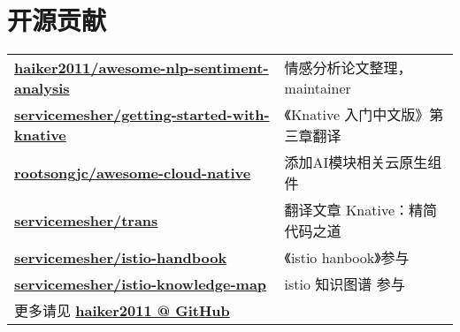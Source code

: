 \documentclass[]{deedy-resume-openfont}
\begin{document}
\begin{minipage}[t]{0.68\textwidth}
\section{开源贡献}
\begin{tabular}{ll}
\href{https://github.com/haiker2011/awesome-nlp-sentiment-analysis/commits?author=haiker2011}{\bf haiker2011/awesome-nlp-sentiment-analysis} & 情感分析论文整理，maintainer \\
\href{https://github.com/servicemesher/getting-started-with-knative/commits?author=haiker2011}{\bf servicemesher/getting-started-with-knative} & 《Knative 入门中文版》第三章翻译 \\
\href{https://github.com/rootsongjc/awesome-cloud-native/commits?author=haiker2011}{\bf rootsongjc/awesome-cloud-native} & 添加AI模块相关云原生组件 \\
\href{https://github.com/servicemesher/trans/commits?author=haiker2011}{\bf servicemesher/trans} & 翻译文章 Knative：精简代码之道 \\
\href{https://github.com/servicemesher/istio-handbook/commits?author=haiker2011}{\bf servicemesher/istio-handbook} & 《istio hanbook》参与 \\
\href{https://github.com/servicemesher/istio-knowledge-map/commits?author=haiker2011}{\bf servicemesher/istio-knowledge-map} & istio 知识图谱 参与 \\
更多请见 \href{https://github.com/haiker2011}{\bf haiker2011 @ GitHub} & \\
\end{tabular}
\sectionsep


\end{minipage} 
\end{document}
